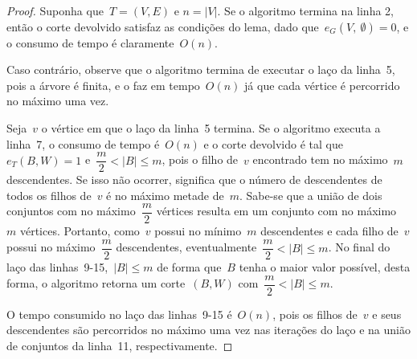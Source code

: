 \bigskip

	
	\begin{proof}
	Suponha que~${T=(V,E)}$ e ${n=|V|}$.
	Se o algoritmo termina na linha 2, então o corte 
	devolvido satisfaz 
	as condições do lema, dado 
	que~${e_G(V,\ \emptyset) = 0}$,
	e o consumo de tempo é claramente~$O(n)$. 

	Caso contrário, observe que o algoritmo termina de executar o laço
	da linha~5, pois a árvore é finita, e o faz em tempo~$O(n)$
	já que cada vértice é percorrido no máximo uma vez.

	Seja~$v$ o vértice em que o laço da linha~5 termina.
	Se o algoritmo executa a linha~7, o consumo de tempo é~$O(n)$
	e o corte devolvido é tal que~${e_T(B,W) = 1}$
	e~${\dfrac{m}{2}<|B|\le m}$, pois o filho de~$v$ encontrado tem no 
	máximo~$m$ descendentes.
	Se isso não ocorrer, significa que o número de descendentes de 
	todos os filhos de~$v$ é no máximo metade de~$m$.
	Sabe-se que a união de dois conjuntos
	com no máximo~${\dfrac{m}{2}}$ vértices resulta em um conjunto
	com no máximo~$m$ vértices.
	Portanto, como~$v$ possui no mínimo~$m$ descendentes
	e cada filho de~$v$ possui no máximo~${\dfrac{m}{2}}$
	descendentes, 
	eventualmente~${\dfrac{m}{2} < |B| \le m}$. 
	No final do laço das linhas~9-15,~${|B|\le m}$
	de forma que~$B$ tenha o maior valor possível,
	desta forma, o algoritmo retorna um corte~$(B,W)$
	com~${\dfrac{m}{2} < |B| \le m}$.

	O tempo consumido no laço das linhas~9-15 é~$O(n)$, pois
	os filhos de~$v$ e seus descendentes são percorridos no máximo
	uma vez nas iterações do laço e na união de conjuntos da linha~11,
	respectivamente.
	\end{proof}


